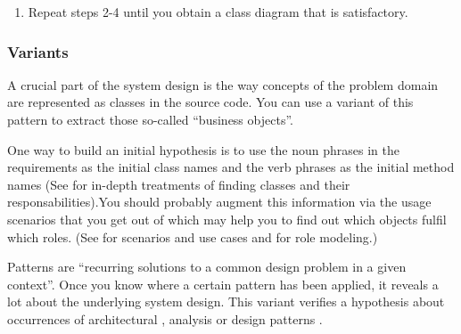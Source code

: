 \documentclass[a4paper,10pt,twoside]{book}
\begin{document}
\begin{enumerate}
(b) \emph{remodelling}, when you find out that the source-code representation of the design 
concept does not correspond with what you have in your model. For instance, you may 
transform an operation into a class, or an attribute into an operation.

(c) \emph{extending}, when you detect important elements in the source-code that do not 
appear in your class diagram;

(d) \emph{seeking alternatives}, when you do not find the design concept in the source-
code. This may entail trying synonyms when there are few mismatches but may also entail 
defining a completely different class diagram when there are lots of mismatches.

  \item Repeat steps 2-4 until you obtain a class diagram that is satisfactory.

\end{enumerate}

\subsubsection*{Variants}

A crucial part of the system design is the way concepts of the problem domain are 
represented as classes in the source code. You can use a variant of this pattern to extract 
those so-called ``business objects''.

One way to build an initial hypothesis is to use the noun phrases in the requirements as 
the initial class names and the verb phrases as the initial method names (See 
\cite{Wirf90b} \cite{Bell97a} \cite{Booc94a} for in-depth treatments of finding classes and 
their responsabilities).You should probably augment this information via the usage 
scenarios that you get out of  which 
may help you to find out which objects fulfil which roles. (See \cite{Jaco92a} 
\cite{Schn98a} for scenarios and use cases and \cite{Reen96a} \cite{Rieh98a} for role 
modeling.)

Patterns are ``recurring solutions to a common design problem in a given context''. Once 
you know where a certain pattern has been applied, it reveals a lot about the underlying 
system design. This variant verifies a hypothesis about occurrences of architectural 
\cite{Busc96a}, analysis \cite{Fowl97b} or design patterns \cite{Gamm95a}.
\end{document}
